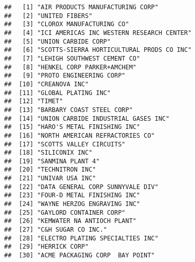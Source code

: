 \documentclass[
]{book}
\newenvironment{Shaded}{\begin{snugshade}}{\end{snugshade}}
\newcommand{\CommentTok}[1]{\textcolor[rgb]{0.56,0.35,0.01}{\textit{#1}}}
\newcommand{\KeywordTok}[1]{\textcolor[rgb]{0.13,0.29,0.53}{\textbf{#1}}}
\newcommand{\NormalTok}[1]{#1}
\newcommand{\OperatorTok}[1]{\textcolor[rgb]{0.81,0.36,0.00}{\textbf{#1}}}
\newcommand{\StringTok}[1]{\textcolor[rgb]{0.31,0.60,0.02}{#1}}
\begin{document}
\begin{Shaded}
\end{Shaded}

\begin{verbatim}
##   [1] "AIR PRODUCTS MANUFACTURING CORP"                         
##   [2] "UNITED FIBERS"                                           
##   [3] "CLOROX MANUFACTURING CO"                                 
##   [4] "ICI AMERICAS INC WESTERN RESEARCH CENTER"                
##   [5] "UNION CARBIDE CORP"                                      
##   [6] "SCOTTS-SIERRA HORTICULTURAL PRODS CO INC"                
##   [7] "LEHIGH SOUTHWEST CEMENT CO"                              
##   [8] "HENKEL CORP PARKER+AMCHEM"                               
##   [9] "PROTO ENGINEERING CORP"                                  
##  [10] "CREANOVA INC"                                            
##  [11] "GLOBAL PLATING INC"                                      
##  [12] "TIMET"                                                   
##  [13] "BARBARY COAST STEEL CORP"                                
##  [14] "UNION CARBIDE INDUSTRIAL GASES INC"                      
##  [15] "HARO'S METAL FINISHING INC"                              
##  [16] "NORTH AMERICAN REFRACTORIES CO"                          
##  [17] "SCOTTS VALLEY CIRCUITS"                                  
##  [18] "SILICONIX INC"                                           
##  [19] "SANMINA PLANT 4"                                         
##  [20] "TECHNITRON INC"                                          
##  [21] "UNIVAR USA INC"                                          
##  [22] "DATA GENERAL CORP SUNNYVALE DIV"                         
##  [23] "FOUR-D METAL FINISHING INC"                              
##  [24] "WAYNE HERZOG ENGRAVING INC"                              
##  [25] "GAYLORD CONTAINER CORP"                                  
##  [26] "KEMWATER NA ANTIOCH PLANT"                               
##  [27] "C&H SUGAR CO INC."                                       
##  [28] "ELECTRO PLATING SPECIALTIES INC"                         
##  [29] "HERRICK CORP"                                            
##  [30] "ACME PACKAGING CORP  BAY POINT"                          

\end{verbatim}
\end{document}
